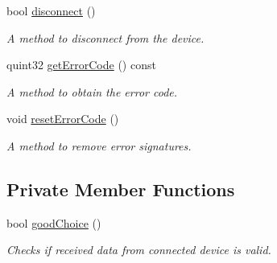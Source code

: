 \begin{DoxyCompactItemize}
bool \mbox{\hyperlink{class_serial_port_reader_a40d30745fd700e05d534b38c4ba4939b}{disconnect}} ()
\begin{DoxyCompactList}\small\item\em A method to disconnect from the device. \end{DoxyCompactList}\item 
quint32 \mbox{\hyperlink{class_serial_port_reader_a33a6f505ebf902bf3a3f64970c6a7cec}{get\+Error\+Code}} () const
\begin{DoxyCompactList}\small\item\em A method to obtain the error code. \end{DoxyCompactList}\item 
void \mbox{\hyperlink{class_serial_port_reader_a03d89e1219ecadd67bad6a56ac6dfee2}{reset\+Error\+Code}} ()
\begin{DoxyCompactList}\small\item\em A method to remove error signatures. \end{DoxyCompactList}\end{DoxyCompactItemize}
\subsection*{Private Member Functions}
\begin{DoxyCompactItemize}
\item 
bool \mbox{\hyperlink{class_serial_port_reader_aba5b7292f941e824467f5b1134f7f15f}{good\+Choice}} ()
\begin{DoxyCompactList}\small\item\em Checks if received data from connected device is valid. \end{DoxyCompactList}\end{DoxyCompactItemize}
